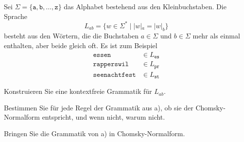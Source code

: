 Sei $\Sigma=\{\texttt{a},\texttt{b},\dots,\texttt{z}\}$ das Alphabet
bestehend aus den Kleinbuchstaben.
Die Sprache
\[
L_{ab}=\{w\in\Sigma^*\;|\; |w|_a=|w|_b\}
\]
besteht aus den Wörtern, die die Buchstaben $a\in \Sigma$ und $b\in\Sigma$
mehr als einmal enthalten, aber beide gleich oft.
Es ist zum Beispiel
\begin{align*}
\texttt{essen}&\in L_{\texttt{es}}\\
\texttt{rapperswil}&\in L_{\texttt{pr}}\\
\texttt{seenachtfest}&\in L_{\texttt{st}}
\end{align*}
\begin{teilaufgaben}
\item
Konstruieren Sie eine kontextfreie Grammatik für $L_{ab}$.
\item
Bestimmen Sie für jede Regel der Grammatik aus a), ob sie der
Chomsky-Normalform entspricht, und wenn nicht, warum nicht.
\item
Bringen Sie die Grammatik von a) in Chomsky-Normalform.
\end{teilaufgaben}

